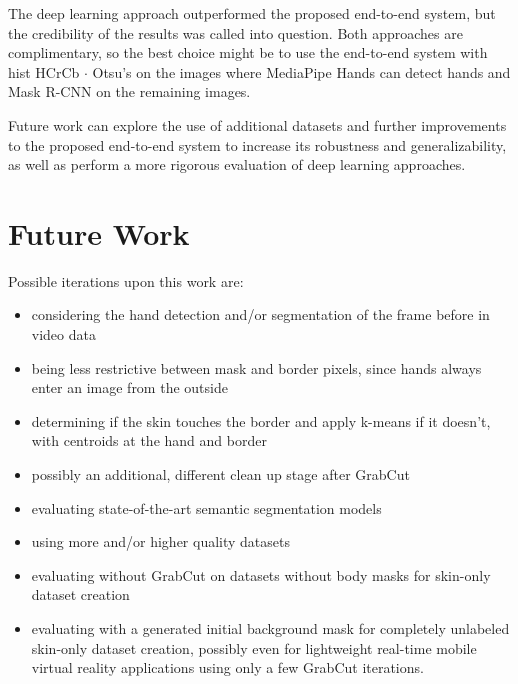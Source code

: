 \documentclass[conference]{IEEEtran}
\begin{document}
The deep learning approach outperformed the proposed end-to-end system, but the credibility of the results was called into question. Both approaches are complimentary, so the best choice might be to use the end-to-end system with hist HCrCb $\cdot$ Otsu's on the images where MediaPipe Hands can detect hands and Mask R-CNN on the remaining images.

Future work can explore the use of additional datasets and further improvements to the proposed end-to-end system to increase its robustness and generalizability, as well as perform a more rigorous evaluation of deep learning approaches.

\section{Future Work}

Possible iterations upon this work are:

\begin{itemize}
	\item considering the hand detection and/or segmentation of the frame before in video data
	\item being less restrictive between mask and border pixels, since hands always enter an image from the outside
	\item determining if the skin touches the border and apply k-means if it doesn't, with centroids at the hand and border
	\item possibly an additional, different clean up stage after GrabCut
	\item evaluating state-of-the-art semantic segmentation models
	\item using more and/or higher quality datasets
	\item evaluating without GrabCut on datasets without body masks for skin-only dataset creation
	\item evaluating with a generated initial background mask for completely unlabeled skin-only dataset creation, possibly even for lightweight real-time mobile virtual reality applications using only a few GrabCut iterations.
\end{itemize}
\end{document}
